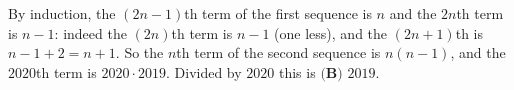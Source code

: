 By induction, the $(2n-1)$th term of the first sequence is $n$ and the $2n$th term is $n-1$: indeed the $(2n)$th term is $n-1$ (one less), and the $(2n+1)$th is $n-1+2=n+1$. So the $n$th term of the second sequence is $n(n-1)$, and the $2020$th term is $2020\cdot2019$. Divided by $2020$ this is $\boxed{\textbf{(B) }2019}$.
